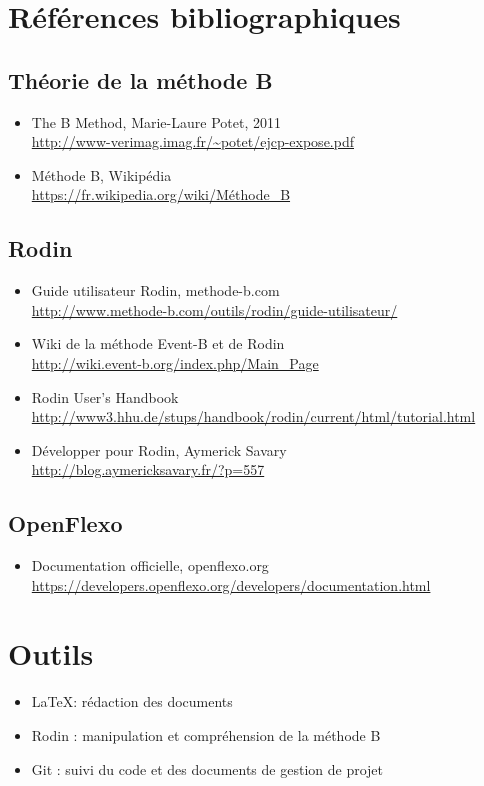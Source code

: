 \documentclass{article}
\newcommand{\rawHref}[1]{\hspace{0.2em}\textcolor{imtaLightBlue}{\href{#1}{#1}}\hspace{0.2em}}
\begin{document}
\newpage



\section{Références bibliographiques}

\subsection{Théorie de la méthode B}

\begin{itemize}
    \item The B Method, Marie-Laure Potet, 2011 \\ \rawHref{http://www-verimag.imag.fr/\textasciitilde{}potet/ejcp-expose.pdf}
    \item Méthode B, Wikipédia \\ \rawHref{https://fr.wikipedia.org/wiki/Méthode\_B}
\end{itemize}

\subsection{Rodin}

\begin{itemize}
    \item Guide utilisateur Rodin, methode-b.com \\ \rawHref{http://www.methode-b.com/outils/rodin/guide-utilisateur/}
    \item Wiki de la méthode Event-B et de Rodin \\ \rawHref{http://wiki.event-b.org/index.php/Main\_Page}
    \item Rodin User's Handbook \\ \rawHref{http://www3.hhu.de/stups/handbook/rodin/current/html/tutorial.html}
    \item Développer pour Rodin, Aymerick Savary \\ \rawHref{http://blog.aymericksavary.fr/?p=557}
\end{itemize}

\subsection{OpenFlexo}

\begin{itemize}
    \item Documentation officielle, openflexo.org \\ \rawHref{https://developers.openflexo.org/developers/documentation.html}
\end{itemize}


\section{Outils}

\begin{itemize}
    \item \LaTeX : rédaction des documents
    \item Rodin : manipulation et compréhension de la méthode B
    \item Git : suivi du code et des documents de gestion de projet
\end{itemize}
\end{document}
